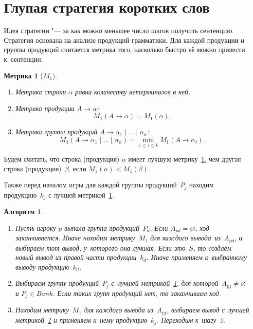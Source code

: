 \documentclass{csmathnotes}
\newtheorem{algoritm}{Алгоритм}
\newtheorem{metric}{Метрика}
\begin{document}
\section*{Глупая стратегия коротких слов}

Идея стратегии "--- за как можно меньшее число шагов получить сентенцию. Стратегия основана на анализе продукций грамматики. Для каждой продукции и группы продукций считается метрика того, насколько быстро её можно привести к~сентенции. 

\begin{metric}[$M_1$]
	\label{metric1}
	\
	\begin{enumerate}
		\item Метрика строки $\alpha$ равна количеству нетерминалов в ней.
		
		\item Метрика продукции $A \rightarrow \alpha$: \[M_1(A\rightarrow\alpha)=M_1(\alpha).\]
		
		\item Метрика группы продукций $A \rightarrow \alpha_1\mid \ldots \mid \alpha_k$: \[M_1(A \rightarrow \alpha_1\mid\ldots\mid\alpha_k)=\min_{1 \leqslant i \leqslant k}M_1(A\rightarrow\alpha_i).\]
	\end{enumerate}
\end{metric}

Будем считать, что строка (продукция) $\alpha$ имеет лучшую метрику~\ref{metric1}, чем другая строка (продукция)~$\beta$, если $M_1(\alpha)< M_1(\beta)$.

Также перед началом игры для каждой группы продукций~$P_j$ находим продукцию~$k_j$ с лучшей  метрикой~\ref{metric1}.

\begin{algoritm}
	\label{algoritm2}
	\
	\begin{enumerate}
		\item Пусть игроку $p$ выпала группа продукций~$P_d$. Если $A_{pd} = \varnothing$, ход заканчивается. Иначе находим метрику~$M_1$ для каждого вывода~из~$A_{pd}$, и выбираем тот вывод, у~которого она лучшая. Если это~$S$, то создаём новый вывод из правой части продукции~$k_d$. Иначе применяем к~выбранному выводу продукцию~$k_d$.
		\item Выбираем группу продукций~$P_j$ с~лучшей метрикой~\ref{metric1}, для которой~$A_{pj} \neq \varnothing$ и $P_j \in Bank$. Если таких групп продукций нет, то заканчиваем ход.
		\item Находим метрику~$M_1$ для каждого вывода из~$A_{pj}$, выбираем вывод с~лучшей метрикой~\ref{metric1} и применяем к~нему продукцию~$k_j$. Переходим к~шагу~2.
	\end{enumerate}
\end{algoritm}
\end{document}
